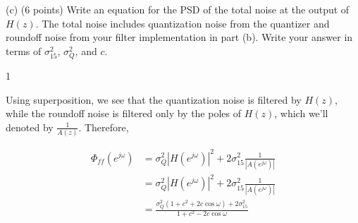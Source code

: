 \documentclass[10pt]{article}
\def\SOLUTIONS{1} %
\def\SolutionsColor{red2}
\begin{document}
\begin{description}
\item{(c)} (6 points) Write an equation for the PSD of the total noise at the output of $H(z)$. The total noise includes quantization noise from the quantizer and roundoff noise from your filter implementation in part (b). Write your answer in terms of $\sigma_{15}^2$, $\sigma_{Q}^2$, and $c$.

\if\SOLUTIONS1
{\color{\SolutionsColor}
Using superposition, we see that the quantization noise is filtered by $H(z)$, while the roundoff noise is filtered only by the poles of $H(z)$, which we'll denoted by $\frac{1}{A(z)}$. Therefore,

\begin{align*}
\Phi_{ff}(e^{j\omega}) &= \sigma_Q^2|H(e^{j\omega})|^2 + 2\sigma_{15}^2\frac{1}{|A(e^{j\omega})|} \\
&= \sigma_Q^2|H(e^{j\omega})|^2 + 2\sigma_{15}^2\frac{1}{|A(e^{j\omega})|} \\
& = \frac{\sigma_Q^2(1 + c^2 + 2c\cos\omega) + 2\sigma_{15}^2}{1 + c^2 - 2c\cos\omega}
\end{align*}

}
\else\vspace{5cm}
\fi
\end{description}
\end{document}
